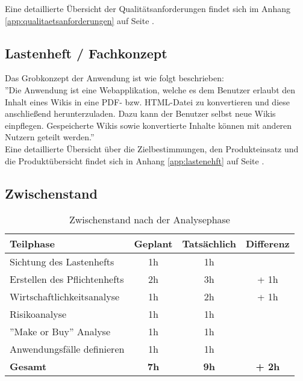 \documentclass[12pt, xcolor=dvipsnames]{scrartcl}
\begin{document}
Eine detaillierte Übersicht der Qualitätsanforderungen findet sich im Anhang \ref{app:qualitaetsanforderungen} auf Seite \pageref{app:qualitaetsanforderungen}.


\subsection{Lastenheft / Fachkonzept}

Das Grobkonzept der Anwendung ist wie folgt beschrieben: \\

''Die Anwendung ist eine Webapplikation, welche es dem Benutzer erlaubt den Inhalt eines 
Wikis in eine PDF- bzw. HTML-Datei zu konvertieren und diese anschließend herunterzuladen.
Dazu kann der Benutzer selbst neue Wikis einpflegen. Gespeicherte Wikis sowie konvertierte Inhalte können mit anderen Nutzern geteilt werden.'' \\

Eine detaillierte Übersicht über die Zielbestimmungen, den Produkteinsatz und die Produktübersicht findet sich in Anhang \ref{app:lastenehft} auf Seite \pageref{app:lastenehft}.


\subsection{Zwischenstand}


\begin{table}[H]
	\centering
	\begin{tabular}{lccc}

		\rowcolor{white!15}				
		\textbf{Teilphase} & \textbf{Geplant} & \textbf{Tatsächlich} & \textbf{Differenz} \\\hline		
		

		Sichtung des Lastenhefts & 1h & 1h & \\	    
	    Erstellen des Pflichtenhefts & 2h & 3h &  + 1h\\	    
	    Wirtschaftlichkeitsanalyse & 1h & 2h & + 1h\\	     
	    Risikoanalyse & 1h & 1h & \\	      
	    ''Make or Buy'' Analyse & 1h & 1h & \\	    
		Anwendungsfälle definieren & 1h & 1h & \\\hline

		\rowcolor{white!15}				
		\textbf{Gesamt} & \textbf{7h} & \textbf{9h} & \textbf{+ 2h} \\			

	    
	\end{tabular}
	\caption{Zwischenstand nach der Analysephase}
	\label{tab:zwischenstand_analysephase}
	\end{table}
\end{document}
